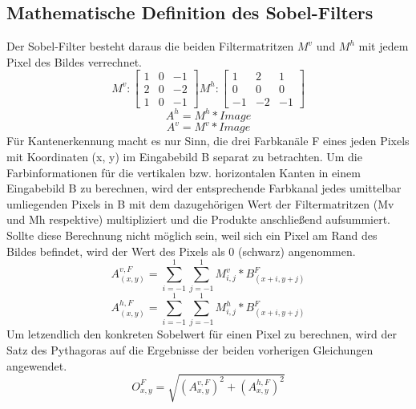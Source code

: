 \documentclass[course=erap]{aspdoc}
\begin{document}
\subsection{Mathematische Definition des Sobel-Filters}
\label{sec:math-def}
Der Sobel-Filter besteht daraus die beiden Filtermatritzen $M^{v}$ und $M^{h}$ mit jedem Pixel des Bildes verrechnet.
\begin{equation}
    M^{v} :
    \begin{bmatrix}
        1 & 0 & -1 \\
        2 & 0 & -2 \\
        1 & 0 & -1
    \end{bmatrix}
    M^{h} :
    \begin{bmatrix}
        1 & 2 & 1 \\
        0 & 0 & 0 \\
        -1 & -2 & -1
    \end{bmatrix}
\end{equation}
\begin{equation}
    A^{h} = M^{h} * Image
\end{equation}
\begin{equation}
    A^{v} = M^{v} * Image
\end{equation}
Für Kantenerkennung macht es nur Sinn, die drei Farbkanäle F eines jeden Pixels mit Koordinaten (x, y) im Eingabebild B separat zu betrachten.
Um die Farbinformationen für die vertikalen bzw. horizontalen Kanten in einem Eingabebild B zu berechnen, wird der entsprechende Farbkanal jedes umittelbar umliegenden Pixels in B mit dem dazugehörigen Wert der Filtermatritzen (Mv und Mh respektive) multipliziert und die Produkte anschließend aufsummiert.
Sollte diese Berechnung nicht möglich sein, weil sich ein Pixel am Rand des Bildes befindet, wird der Wert des Pixels als 0 (schwarz) angenommen.
\begin{equation}
    A_(x,y)^{v,F} = \sum_{i=-1}^{1} \sum_{j=-1}^{1} M^{v}_{i,j} * B_{(x+i,y+j)}^{F}
\end{equation}
\begin{equation}
    A_(x,y)^{h,F} = \sum_{i=-1}^{1} \sum_{j=-1}^{1} M^{h}_{i,j} * B_{(x+i,y+j)}^{F}
\end{equation}
Um letzendlich den konkreten Sobelwert für einen Pixel zu berechnen, wird der Satz des Pythagoras auf die Ergebnisse der beiden vorherigen Gleichungen angewendet.
\begin{equation}
    O^{F}_{x,y} = \sqrt{(A^{v,F}_{x,y})^2 + (A^{h,F}_{x,y})^2}
    \label{eq:wurzel}
\end{equation}
\end{document}
